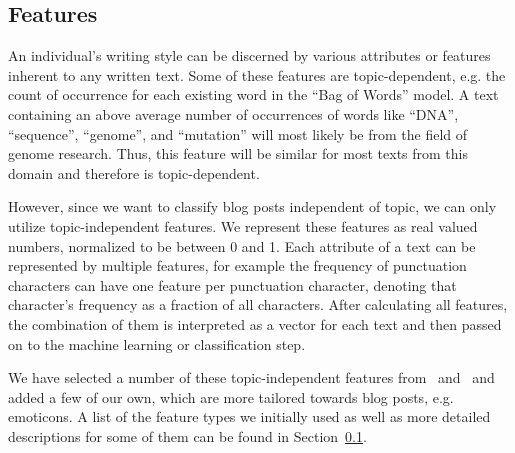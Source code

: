 \subsection{Features}
\label{sec:features}

An individual's writing style can be discerned by various attributes or features inherent to any written text.
Some of these features are topic-dependent, e.g. the count of occurrence for each existing word in the ``Bag of Words'' model.
A text containing an above average number of occurrences of words like ``DNA'', ``sequence'', ``genome'', and ``mutation'' will most likely be from the field of genome research.
Thus, this feature will be similar for most texts from this domain and therefore is topic-dependent.


However, since we want to classify blog posts independent of topic, we can only utilize topic-independent features.
We represent these features as real valued numbers, normalized to be between 0 and 1.
Each attribute of a text can be represented by multiple features, for example the frequency of punctuation characters can have one feature per punctuation character, denoting that character's frequency as a fraction of all characters.
After calculating all features, the combination of them is interpreted as a vector for each text and then passed on to the machine learning or classification step.


We have selected a number of these topic-independent features from~\cite{madigan2005author} and~\cite{narayanan2012feasibility} and added a few of our own, which are more tailored towards blog posts, e.g. emoticons.
A list of the feature types we initially used as well as more detailed descriptions for some of them can be found in Section~\ref{sec:features}.
